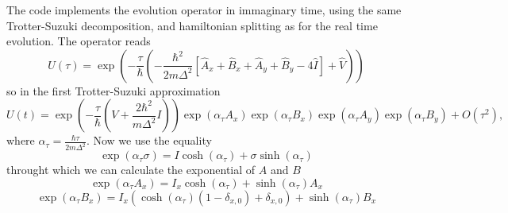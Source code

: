 The code implements the evolution operator in immaginary time, using the same Trotter-Suzuki decomposition, and hamiltonian splitting as for the real time evolution. The operator reads
\begin{equation}
U(\tau) =   \exp\left(-\frac{\tau}{\hbar} \left( -\frac{\hbar^2}{2 m \Delta^2} \left[ \hat{A}_x + \hat{B}_x + \hat{A}_y + \hat{B}_y - 4 \hat{I} \right] + \hat{V} \right) \right)
\end{equation} 
so in the first Trotter-Suzuki approximation
\begin{equation}
U(t) = \exp\left(-\frac{\tau}{\hbar}\left(V + \frac{2 \hbar^2}{m \Delta^2} I\right) \right) \exp\left(\alpha_\tau A_x \right) \exp\left( \alpha_\tau B_x \right) \exp\left( \alpha_\tau A_y \right) \exp\left( \alpha_\tau B_y \right) + O(\tau^2),
\end{equation}
where $\alpha_\tau = \frac{\hbar \tau}{2m\Delta^2}$. Now we use the equality
\begin{equation}
\exp( \alpha_\tau \sigma) = I \cosh(\alpha_\tau) +  \sigma \sinh(\alpha_\tau)
\end{equation}
throught which we can calculate the exponential of $A$ and $B$
\begin{equation}
\exp\left( \alpha_\tau A_x \right) = I_x \cosh(\alpha_\tau) + \sinh(\alpha_\tau) A_x
\end{equation}
\begin{equation}
\exp\left( \alpha_\tau B_x \right) = I_x (\cosh(\alpha_\tau)(1-\delta_{x,0}) + \delta_{x,0}) +  \sinh(\alpha_\tau) B_x
\end{equation}
